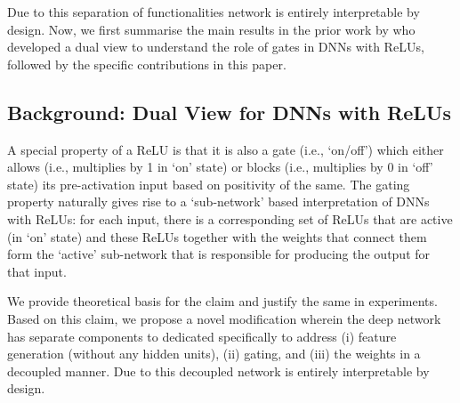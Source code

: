 \documentclass{article} %
\begin{document}
Due to this separation of functionalities network is entirely interpretable by design. Now, we first summarise the main results in the prior work by \cite{npk} who developed a dual view to understand the role of gates in DNNs with ReLUs, followed by the specific contributions in this paper.






\subsection{Background: Dual View for DNNs with ReLUs}

A special property of a ReLU is that it is also a gate (i.e., `on/off') which either allows (i.e., multiplies by 1 in ‘on’ state) or blocks (i.e., multiplies by 0 in ‘off’ state) its pre-activation input based on positivity of the same. The gating property naturally gives rise to a ‘sub-network’ based interpretation of DNNs with ReLUs: for each input, there is a corresponding set of ReLUs that are active (in ‘on’ state) and these ReLUs together with the weights that connect them form the ‘active’ sub-network that is responsible for producing the output for that input.


We provide theoretical basis for the claim and justify the same in experiments. Based on this claim, we propose a novel modification wherein the deep network has separate components to dedicated specifically to address (i) feature generation (without any hidden units), (ii) gating, and (iii) the weights in a decoupled manner. Due to this decoupled network is entirely interpretable by design. 
\end{document}
